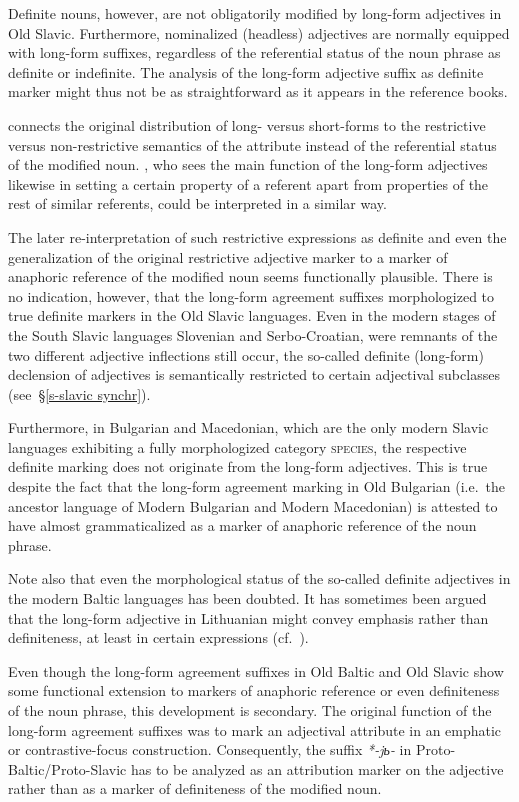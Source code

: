 Definite nouns, however, are not obligatorily modified by long-form adjectives in Old Slavic. Furthermore, nominalized (headless) adjectives are normally equipped with long-form suffixes, regardless of the referential status of the noun phrase as definite or indefinite. The analysis of the long-form adjective suffix as definite marker might thus not be as straightforward as it appears in the reference books. 

\citet[214–215]{mendoza2004} connects the original distribution of long- versus short-forms to the restrictive versus non-restrictive semantics of the attribute instead of the referential status of the modified noun. \citet{tolstoj1957}, who sees the main function of the long-form adjectives likewise in setting a certain property of a referent apart from properties of the rest of similar referents, could be interpreted in a similar way.

The later re-interpretation of such restrictive expressions as definite and even the generalization of the original restrictive adjective marker to a marker of anaphoric reference of the modified noun seems functionally plausible. There is no indication, however, that the long-form agreement suffixes morphologized to true definite markers in the Old Slavic languages. Even in the modern stages of the South Slavic languages Slovenian and Serbo-Croatian, were remnants of the two different adjective inflections still occur, the so-called definite (long-form) declension of adjectives is semantically restricted to certain adjectival subclasses (see~\S\ref{s-slavic synchr}). 

Furthermore, in Bulgarian and Macedonian, which are the only modern Slavic languages exhibiting a fully morphologized category \textsc{species}, the respective definite marking does not originate from the long-form adjectives. This is true despite the fact that the long-form agreement marking in Old Bulgarian (i.e.~the ancestor language of Modern Bulgarian and Modern Macedonian) is attested to have almost grammaticalized as a marker of anaphoric reference of the noun phrase.

Note also that even the morphological status of the so-called definite adjectives in the modern Baltic languages has been doubted. It has sometimes been argued that the long-form adjective in Lithuanian might convey emphasis rather than definiteness, at least in certain expressions (cf.~\citealt[181–182]{kramsky1972}).

Even though the long-form agreement suffixes in Old Baltic and Old Slavic show some functional extension to markers of anaphoric reference or even definiteness of the noun phrase, this development is secondary. The original function of the long-form agreement suffixes was to mark an adjectival attribute in an emphatic or contrastive-focus construction. Consequently, the suffix \textit{*-jь-} in Proto-Baltic/Proto-Slavic has to be analyzed as an attribution marker on the adjective rather than as a marker of definiteness of the modified noun.

